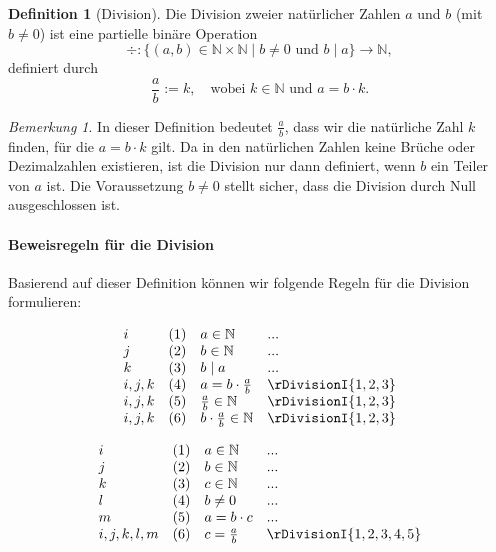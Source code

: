 \documentclass{book}
\theoremstyle{plain}
\theoremstyle{remark}
\newtheorem*{remark}{Bemerkung}
\theoremstyle{definition}
\newtheorem{definition}{Definition}[section]
\begin{document}
\begin{definition}[Division]
Die Division zweier natürlicher Zahlen \( a \) und \( b \) (mit \( b \neq 0 \)) ist eine partielle binäre Operation
\[
\div : \{(a, b) \in \mathbb{N} \times \mathbb{N} \mid b \neq 0 \text{ und } b \mid a\} \to \mathbb{N},
\]
definiert durch
\[
\frac{a}{b} := k, \quad \text{wobei } k \in \mathbb{N} \text{ und } a = b \cdot k.
\]
\end{definition}

\begin{remark}
In dieser Definition bedeutet \(\frac{a}{b}\), dass wir die natürliche Zahl \( k \) finden, für die \( a = b \cdot k \) gilt. Da in den natürlichen Zahlen keine Brüche oder Dezimalzahlen existieren, ist die Division nur dann definiert, wenn \( b \) ein Teiler von \( a \) ist. Die Voraussetzung \( b \neq 0 \) stellt sicher, dass die Division durch Null ausgeschlossen ist.
\end{remark}

\paragraph{Beweisregeln für die Division}
\label{rule:rDivisionI}
Basierend auf dieser Definition können wir folgende Regeln für die Division formulieren:

\[
\begin{array}{llll}
    i & (1) & a \in \mathbb{N} & ... \\
    j & (2) & b \in \mathbb{N} & ... \\
    k & (3) & b \mid a & ... \\
    i,j,k & (4) & a = b \cdot \frac{a}{b} & \rDivisionI{1,2,3} \\
    i,j,k & (5) & \frac{a}{b} \in \mathbb{N} & \rDivisionI{1,2,3} \\
    i,j,k & (6) & b\cdot \frac{a}{b} \in \mathbb{N} & \rDivisionI{1,2,3} \\
\end{array}
\]

\[
\begin{array}{llll}
    i & (1) & a \in \mathbb{N} & ... \\
    j & (2) & b \in \mathbb{N} & ... \\
    k & (3) & c \in \mathbb{N} & ... \\
    l & (4) & b\neq 0 & ... \\
    m & (5) & a=b\cdot c & ... \\
    i,j,k,l,m & (6) & c = \frac{a}{b} & \rDivisionI{1,2,3,4,5} \\
\end{array}
\]
\end{document}
